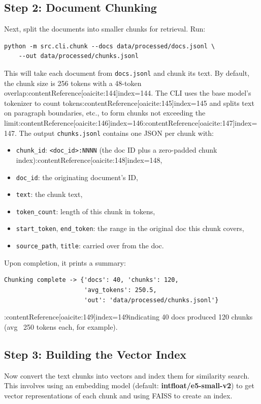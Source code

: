 \documentclass{article}
\begin{document}
\subsection{Step 2: Document Chunking}
Next, split the documents into smaller chunks for retrieval. Run:
\begin{verbatim}
python -m src.cli.chunk --docs data/processed/docs.jsonl \
    --out data/processed/chunks.jsonl
\end{verbatim}
This will take each document from \texttt{docs.jsonl} and chunk its text. By default, the chunk size is 256 tokens with a 48-token overlap:contentReference[oaicite:144]{index=144}. The CLI uses the base model’s tokenizer to count tokens:contentReference[oaicite:145]{index=145} and splits text on paragraph boundaries, etc., to form chunks not exceeding the limit:contentReference[oaicite:146]{index=146}:contentReference[oaicite:147]{index=147}. The output \texttt{chunks.jsonl} contains one JSON per chunk with:
\begin{itemize}
    \item \texttt{chunk\_id}: \texttt{<doc\_id>:NNNN} (the doc ID plus a zero-padded chunk index):contentReference[oaicite:148]{index=148},
    \item \texttt{doc\_id}: the originating document’s ID,
    \item \texttt{text}: the chunk text,
    \item \texttt{token\_count}: length of this chunk in tokens,
    \item \texttt{start\_token}, \texttt{end\_token}: the range in the original doc this chunk covers,
    \item \texttt{source\_path}, \texttt{title}: carried over from the doc.
\end{itemize}

Upon completion, it prints a summary:
\begin{verbatim}
Chunking complete -> {'docs': 40, 'chunks': 120,
                      'avg_tokens': 250.5,
                      'out': 'data/processed/chunks.jsonl'}
\end{verbatim}
:contentReference[oaicite:149]{index=149}indicating 40 docs produced 120 chunks (avg ~250 tokens each, for example).

\subsection{Step 3: Building the Vector Index}
Now convert the text chunks into vectors and index them for similarity search. This involves using an embedding model (default: \textbf{intfloat/e5-small-v2}) to get vector representations of each chunk and using FAISS to create an index.
\end{document}
